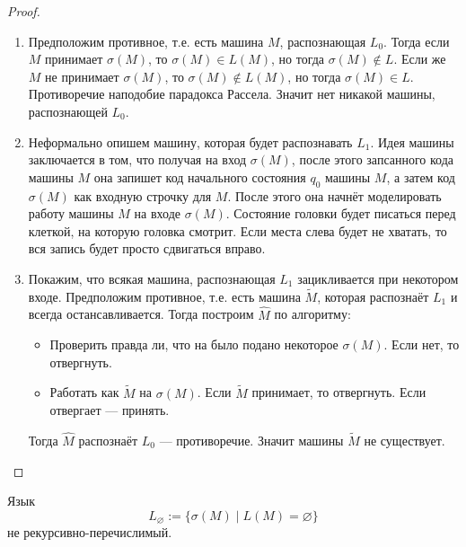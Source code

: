 \documentclass[12pt,a4paper]{article}
\begin{document}
    \begin{proof}
        \begin{enumerate}
            \item Предположим противное, т.е. есть машина $M$, распознающая $L_0$. Тогда если $M$ принимает $\sigma(M)$, то $\sigma(M) \in L(M)$, но тогда $\sigma(M) \notin L$. Если же $M$ не принимает $\sigma(M)$, то $\sigma(M) \notin L(M)$, но тогда $\sigma(M) \in L$. Противоречие наподобие парадокса Рассела. Значит нет никакой машины, распознающей $L_0$.
            \item Неформально опишем машину, которая будет распознавать $L_1$. Идея машины заключается в том, что получая на вход $\sigma(M)$, после этого запсанного кода машины $M$ она запишет код начального состояния $q_0$ машины $M$, а затем код $\sigma(M)$ как входную строчку для $M$. После этого она начнёт моделировать работу машины $M$ на входе $\sigma(M)$. Состояние головки будет писаться перед клеткой, на которую головка смотрит. Если места слева будет не хватать, то вся запись будет просто сдвигаться вправо.
            \item Покажим, что всякая машина, распознающая $L_1$ зацикливается при некотором входе. Предположим противное, т.е. есть машина $\widetilde{M}$, которая распознаёт $L_1$ и всегда остансавливается. Тогда построим $\widehat{M}$ по алгоритму:
                \begin{itemize}
                    \item Проверить правда ли, что на было подано некоторое $\sigma(M)$. Если нет, то отвергнуть.
                    \item Работать как $\widetilde{M}$ на $\sigma(M)$. Если $\widetilde{M}$ принимает, то отвергнуть. Если отвергает --- принять.
                \end{itemize}
                Тогда $\widehat{M}$ распознаёт $L_0$ --- противоречие. Значит машины $\widetilde{M}$ не существует.
        \end{enumerate}
    \end{proof}
    
    \begin{theorem}
        Язык
        \[L_\varnothing := \{\sigma(M) \mid L(M) = \varnothing\}\]
        не рекурсивно-перечислимый.
    \end{theorem}
\end{document}

